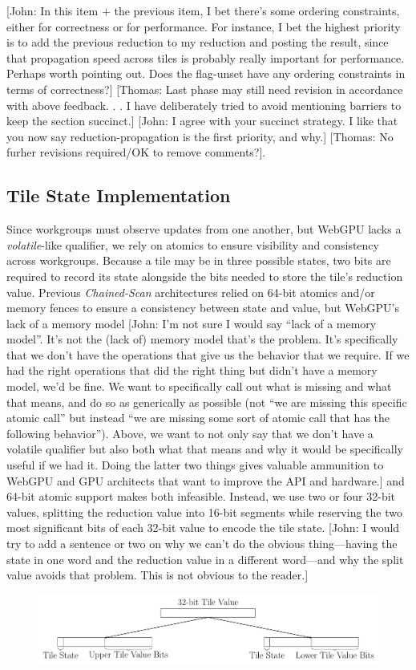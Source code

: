 \documentclass[sigconf]{acmart}
\newcommand{\thomas}[1]{{\footnotesize\color{orange}[Thomas: #1]}}
\newcommand{\john}[1]{{\footnotesize\color{cyan}[John: #1]}}
\begin{document}
\john{In this item + the previous item, I bet there's some ordering constraints, either for correctness or for performance. For instance, I bet the highest priority is to add the previous reduction to my reduction and posting the result, since that propagation speed across tiles is probably really important for performance. Perhaps worth pointing out. Does the flag-unset have any ordering constraints in terms of correctness?}
\thomas{Last phase may still need revision in accordance with above feedback. . . I have deliberately tried to avoid mentioning barriers to keep the section succinct.}
\john{I agree with your succinct strategy. I like that you now say reduction-propagation is the first priority, and why.}
\thomas{No furher revisions required/OK to remove comments?}.

\subsection{Tile State Implementation}
Since workgroups must observe updates from one another, but WebGPU lacks a \emph{volatile}-like qualifier, we rely on atomics to ensure visibility and consistency across workgroups. Because a tile may be in three possible states, two bits are required to record its state alongside the bits needed to store the tile's reduction value. Previous \emph{Chained-Scan} architectures relied on 64-bit atomics and/or memory fences to ensure a consistency between state and value, but WebGPU’s lack of a memory model \john{I'm not sure I would say ``lack of a memory model''. It's not the (lack of) memory model that's the problem. It's specifically that we don't have the operations that give us the behavior that we require. If we had the right operations that did the right thing but didn't have a memory model, we'd be fine. We want to specifically call out what is missing and what that means, and do so as generically as possible (not ``we are missing this specific atomic call'' but instead ``we are missing some sort of atomic call that has the following behavior''). Above, we want to not only say that we don't have a volatile qualifier but also both what that means and why it would be specifically useful if we had it. Doing the latter two things gives valuable ammunition to WebGPU and GPU architects that want to improve the API and hardware.} and 64-bit atomic support makes both infeasible. Instead, we use two or four 32-bit values, splitting the reduction value into 16-bit segments while reserving the two most significant bits of each 32-bit value to encode the tile state. \john{I would try to add a sentence or two on why we can't do the obvious thing---having the state in one word and the reduction value in a different word---and why the split value avoids that problem. This is not obvious to the reader.}
\begin{figure}[h!]
  \centering
  \includegraphics[width=\linewidth]{graphics/split.pdf}
\end{figure}
\end{document}
